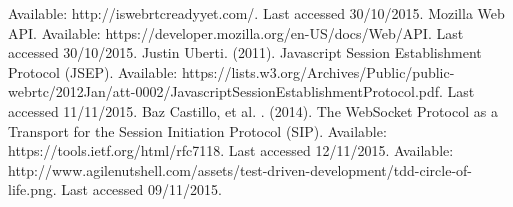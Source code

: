 \documentclass[]{report}
\begin{document}
\begin{thebibliography}{20}
		Available: http://iswebrtcreadyyet.com/. Last accessed 30/10/2015.
		Mozilla Web API. Available: https://developer.mozilla.org/en-US/docs/Web/API. Last accessed 30/10/2015.
		Justin Uberti. (2011). Javascript Session Establishment Protocol (JSEP). Available: https://lists.w3.org/Archives/Public/public-webrtc/2012Jan/att-0002/JavascriptSessionEstablishmentProtocol.pdf. Last accessed 11/11/2015.
		Baz Castillo, et al. . (2014). The WebSocket Protocol as a Transport for the Session Initiation Protocol (SIP). Available: https://tools.ietf.org/html/rfc7118. Last accessed 12/11/2015.
		Available: http://www.agilenutshell.com/assets/test-driven-development/tdd-circle-of-life.png. Last accessed 09/11/2015.
	\end{thebibliography}
\end{document}
